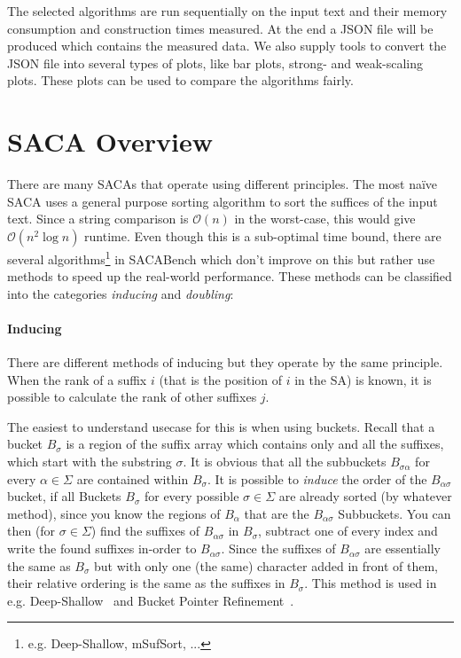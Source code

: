 The selected algorithms are run sequentially on the input text and their memory consumption
and construction times measured.
At the end a JSON file will be produced which contains the measured data.
We also supply tools to convert the JSON file into several types of plots, like bar plots, strong- and weak-scaling plots.
These plots can be used to compare the algorithms fairly.

\section{SACA Overview}

There are many SACAs that operate using different principles.
The most na\"ive SACA uses a general purpose sorting algorithm to sort the suffices of the input text.
Since a string comparison is $\mathcal O (n)$ in the worst-case, this would give $\mathcal O (n^2 \log n)$ runtime.
Even though this is a sub-optimal time bound,
there are several algorithms\footnote{e.g. Deep-Shallow, mSufSort, ...} in SACABench which don't improve on this
but rather use methods to speed up the real-world performance.
These methods can be classified into the categories \emph{inducing} and \emph{doubling}:
%
\paragraph{Inducing} %
There are different methods of inducing but they operate by the same principle.
When the rank of a suffix $i$ (that is the position of $i$ in the SA) is known,
it is possible to calculate the rank of other suffixes $j$.

The easiest to understand usecase for this is when using buckets.
Recall that a bucket $B_{\sigma}$ is a region of the suffix
array which contains only and all the suffixes,
which start with the substring $\sigma$.
It is obvious that all the subbuckets $B_{\sigma\alpha}$ for
every $\alpha \in \Sigma$ are contained within $B_\sigma$.
It is possible to \emph{induce} the order of the $B_{\alpha\sigma}$ bucket,
if all Buckets $B_\sigma$ for every possible $\sigma \in \Sigma$ are already sorted (by whatever method),
since you know the regions of $B_\alpha$ that are the $B_{\alpha\sigma}$ Subbuckets.
You can then (for $\sigma \in \Sigma$) find the suffixes of $B_{\alpha\sigma}$ in $B_{\sigma}$,
subtract one of every index and write the found suffixes in-order to $B_{\alpha\sigma}$.
Since the suffixes of $B_{\alpha\sigma}$ are essentially the same as $B_\sigma$ but
with only one (the same) character added in front of them,
their relative ordering is the same as the suffixes in $B_\sigma$.
This method is used in e.g. Deep-Shallow~\cite{saca:4} and 
Bucket Pointer Refinement~\cite{saca:2}.

